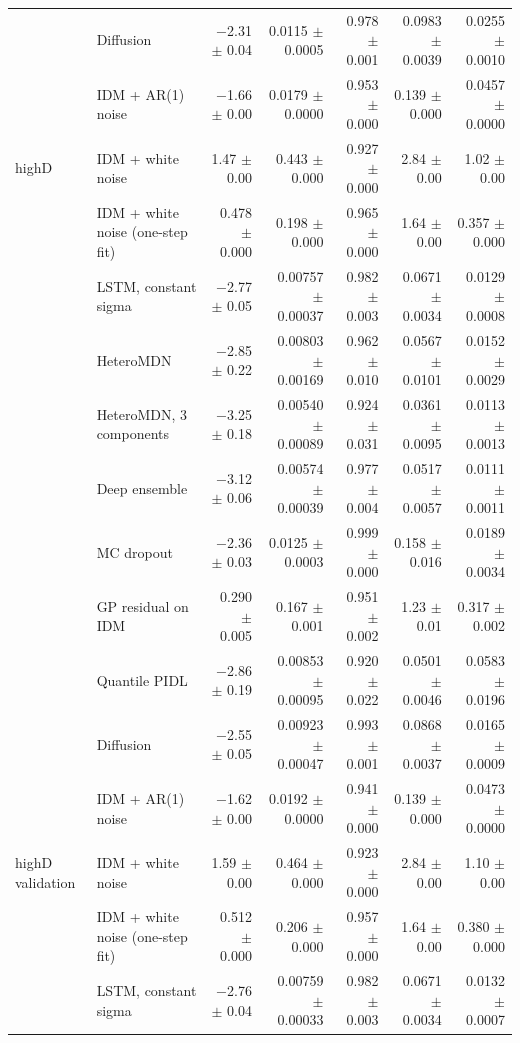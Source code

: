 \begin{longtable}{llrrrrr}
 & Diffusion & $-$2.31 $\pm$ 0.04 & 0.0115 $\pm$ 0.0005 & 0.978 $\pm$ 0.001 & 0.0983 $\pm$ 0.0039 & 0.0255 $\pm$ 0.0010 \\
 & IDM + AR(1) noise & $-$1.66 $\pm$ 0.00 & 0.0179 $\pm$ 0.0000 & 0.953 $\pm$ 0.000 & 0.139 $\pm$ 0.000 & 0.0457 $\pm$ 0.0000 \\
\midrule
highD & IDM + white noise & 1.47 $\pm$ 0.00 & 0.443 $\pm$ 0.000 & 0.927 $\pm$ 0.000 & 2.84 $\pm$ 0.00 & 1.02 $\pm$ 0.00 \\
 & IDM + white noise (one-step fit) & 0.478 $\pm$ 0.000 & 0.198 $\pm$ 0.000 & 0.965 $\pm$ 0.000 & 1.64 $\pm$ 0.00 & 0.357 $\pm$ 0.000 \\
 & LSTM, constant sigma & $-$2.77 $\pm$ 0.05 & 0.00757 $\pm$ 0.00037 & 0.982 $\pm$ 0.003 & 0.0671 $\pm$ 0.0034 & 0.0129 $\pm$ 0.0008 \\
 & HeteroMDN & $-$2.85 $\pm$ 0.22 & 0.00803 $\pm$ 0.00169 & 0.962 $\pm$ 0.010 & 0.0567 $\pm$ 0.0101 & 0.0152 $\pm$ 0.0029 \\
 & HeteroMDN, 3 components & $-$3.25 $\pm$ 0.18 & 0.00540 $\pm$ 0.00089 & 0.924 $\pm$ 0.031 & 0.0361 $\pm$ 0.0095 & 0.0113 $\pm$ 0.0013 \\
 & Deep ensemble & $-$3.12 $\pm$ 0.06 & 0.00574 $\pm$ 0.00039 & 0.977 $\pm$ 0.004 & 0.0517 $\pm$ 0.0057 & 0.0111 $\pm$ 0.0011 \\
 & MC dropout & $-$2.36 $\pm$ 0.03 & 0.0125 $\pm$ 0.0003 & 0.999 $\pm$ 0.000 & 0.158 $\pm$ 0.016 & 0.0189 $\pm$ 0.0034 \\
 & GP residual on IDM & 0.290 $\pm$ 0.005 & 0.167 $\pm$ 0.001 & 0.951 $\pm$ 0.002 & 1.23 $\pm$ 0.01 & 0.317 $\pm$ 0.002 \\
 & Quantile PIDL & $-$2.86 $\pm$ 0.19 & 0.00853 $\pm$ 0.00095 & 0.920 $\pm$ 0.022 & 0.0501 $\pm$ 0.0046 & 0.0583 $\pm$ 0.0196 \\
 & Diffusion & $-$2.55 $\pm$ 0.05 & 0.00923 $\pm$ 0.00047 & 0.993 $\pm$ 0.001 & 0.0868 $\pm$ 0.0037 & 0.0165 $\pm$ 0.0009 \\
 & IDM + AR(1) noise & $-$1.62 $\pm$ 0.00 & 0.0192 $\pm$ 0.0000 & 0.941 $\pm$ 0.000 & 0.139 $\pm$ 0.000 & 0.0473 $\pm$ 0.0000 \\
\midrule
highD validation & IDM + white noise & 1.59 $\pm$ 0.00 & 0.464 $\pm$ 0.000 & 0.923 $\pm$ 0.000 & 2.84 $\pm$ 0.00 & 1.10 $\pm$ 0.00 \\
 & IDM + white noise (one-step fit) & 0.512 $\pm$ 0.000 & 0.206 $\pm$ 0.000 & 0.957 $\pm$ 0.000 & 1.64 $\pm$ 0.00 & 0.380 $\pm$ 0.000 \\
 & LSTM, constant sigma & $-$2.76 $\pm$ 0.04 & 0.00759 $\pm$ 0.00033 & 0.982 $\pm$ 0.003 & 0.0671 $\pm$ 0.0034 & 0.0132 $\pm$ 0.0007 \\

\end{longtable}
